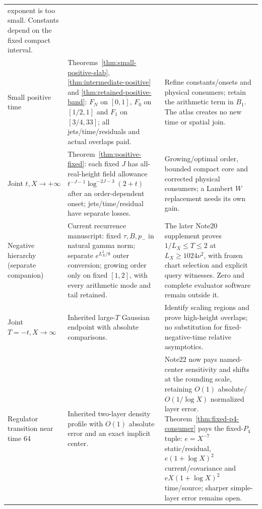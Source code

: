 \documentclass[11pt]{article}
\numberwithin{equation}{section}
\begin{document}
\begin{longtable}{@{}>{\raggedright\arraybackslash}p{}>{\raggedright\arraybackslash}p{}>{\raggedright\arraybackslash}p{}@{}}
exponent is too small. Constants depend on the fixed compact interval.\\
Small positive time &
Theorems~\ref{thm:small-positive-slab}, \ref{thm:intermediate-positive}
and \ref{thm:retained-positive-band}: $F_N$ on $[0,1]$,
$F_0$ on $[1/2,1]$ and $F_1$ on $[3/4,33]$; all jets/time/residuals
and actual overlaps paid. &
Refine constants/onsets and physical consumers; retain the arithmetic
term in $B_1$. The atlas creates no new time or spatial join.\\
Joint \(t,X\to+\infty\) &
Theorem~\ref{thm:positive-fixed}: each fixed $J$ has all-real-height
field allowance $t^{-J-1}\log^{-2J-3}(2+t)$ after an
order-dependent onset; jets/time/residual have separate losses. &
Growing/optimal order, bounded compact core and corrected physical
consumers; a Lambert \(W\) replacement needs its own gain.\\
Negative hierarchy (separate companion) &
Current recurrence manuscript: fixed $\tau,B,p_-$ in natural gamma
norm; separate $e^{L_X^2/8}$ outer conversion; growing order only
on fixed $[1,2]$, with every arithmetic mode and tail retained. &
The later Note20 supplement proves $1/L_X\le T\le2$ at
$L_X\ge1024\nu^2$, with frozen chart selection and explicit query
witnesses. Zero and complete evaluator software remain outside it.\\
Joint \(T=-t,X\to\infty\) &
Inherited large-\(T\) Gaussian endpoint with absolute comparisons. &
Identify scaling regions and prove high-height overlaps; no substitution
for fixed-negative-time relative asymptotics.\\
Regulator transition near time 64 &
Inherited two-layer density profile with \(O(1)\) absolute error
and an exact implicit center. &
Note22 now pays named-center sensitivity and shifts at the rounding
scale, retaining $O(1)$ absolute/$O(1/\log X)$ normalized layer error.
Theorem~\ref{thm:fixed-p4-consumer} pays the fixed-$P_4$ tuple:
$e=X^{-7}$ static/residual, $e(1+\log X)^2$ current/covariance and
$eX(1+\log X)^2$ time/source; sharper simple-layer error remains open.\\
\bottomrule
\end{longtable}
\endgroup
\end{document}
